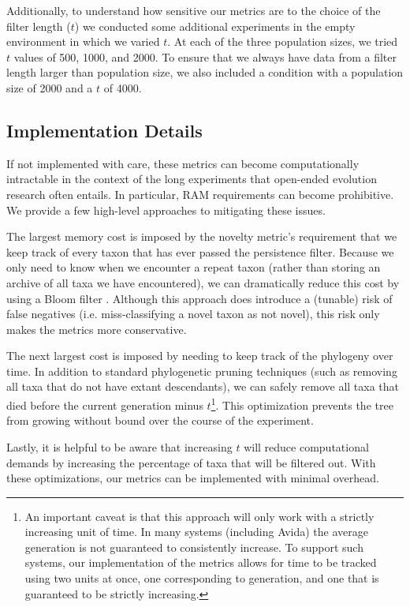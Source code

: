 \documentclass[letterpaper]{article}
\begin{document}
Additionally, to understand how sensitive our metrics are to the choice of the filter length ($t$) we conducted some additional experiments in the empty environment in which we varied $t$. At each of the three population sizes, we tried $t$ values of 500, 1000, and 2000. To ensure that we always have data from a filter length larger than population size, we also included a condition with a population size of 2000 and a $t$ of 4000.

\subsection{Implementation Details}
If not implemented with care, these metrics can become computationally intractable in the context of the long experiments that open-ended evolution research often entails. In particular, RAM requirements can become prohibitive. We provide a few high-level approaches to mitigating these issues.

The largest memory cost is imposed by the novelty metric's requirement that we keep track of every taxon that has ever passed the persistence filter. Because we only need to know when we encounter a repeat taxon (rather than storing an archive of all taxa we have encountered), we can dramatically reduce this cost by using a Bloom filter \citep{Bloom:1970:STH:362686.362692}. Although this approach does introduce a (tunable) risk of false negatives (i.e. miss-classifying a novel taxon as not novel), this risk only makes the metrics more conservative. 

The next largest cost is imposed by needing to keep track of the phylogeny over time. In addition to standard phylogenetic pruning techniques (such as removing all taxa that do not have extant descendants), we can safely remove all taxa that died before the current generation minus $t$\footnote{An important caveat is that this approach will only work with a strictly increasing unit of time. In many systems (including Avida) the average generation is not guaranteed to consistently increase. To support such systems, our implementation of the metrics allows for time to be tracked using two units at once, one corresponding to generation, and one that is guaranteed to be strictly increasing.}. This optimization prevents the tree from growing without bound over the course of the experiment.

Lastly, it is helpful to be aware that increasing $t$ will reduce computational demands by increasing the percentage of taxa that will be filtered out. With these optimizations, our metrics can be implemented with minimal overhead.
\end{document}
